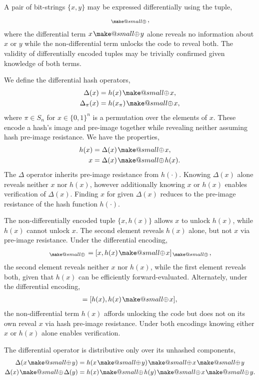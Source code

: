 \documentclass[twocolumn, aps, amsmath, amssymb, nofootinbib, superscriptaddress, longbibliography, doublefloatfix, table-of-contents, eqsecnum, rmp]{revtex4-2}
\makeatletter
\newcommand{\soplus}{{{\hspace{1pt}}{\mathbin{\mathpalette\make@small{\mathbin\oplus}}}}{\hspace{1pt}}}
\newcommand{\make@small}[2]{%
  \vcenter{\hbox{%
    \scalebox{0.6}{$\m@th#1#2$}%
  }}%
}
\makeatother
\begin{document}
A pair of bit-strings $\{x,y\}$ may be expressed differentially using the tuple,
\begin{align}
	[x,x\soplus y]_\soplus,
\end{align}
where the differential term $x\soplus y$ alone reveals no information about $x$ or $y$ while the non-differential term unlocks the code to reveal both. The validity of differentially encoded tuples may be trivially confirmed given knowledge of both terms.

We define the differential hash operators,
\begin{align}
	\Delta(x) &= h(x)\soplus x,\nonumber\\
	\Delta_\pi(x) &= h(x_\pi)\soplus x,
\end{align}
where $\pi\in S_n$ for $x\in\{0,1\}^n$ is a permutation over the elements of $x$. These encode a hash's image and pre-image together while revealing neither assuming hash pre-image resistance. We have the properties,
\begin{align}
	h(x) &= \Delta(x) \soplus x,\nonumber\\
	x &= \Delta(x) \soplus h(x).
\end{align}
The $\Delta$ operator inherits pre-image resistance from $h(\cdot)$. Knowing $\Delta(x)$ alone reveals neither $x$ nor $h(x)$, however additionally knowing $x$ or $h(x)$ enables verification of $\Delta(x)$. Finding $x$ for given $\Delta(x)$ reduces to the pre-image resistance of the hash function $h(\cdot)$.

The non-differentially encoded tuple $\{x,h(x)\}$ allows $x$ to unlock $h(x)$, while $h(x)$ cannot unlock $x$. The second element reveals $h(x)$ alone, but not $x$ via pre-image resistance. Under the differential encoding,
\begin{align}
	[x,\Delta(x)]_\soplus =[x,h(x)\soplus x]_\soplus,
\end{align}
the second element reveals neither $x$ nor $h(x)$, while the first element reveals both, given that $h(x)$ can be efficiently forward-evaluated. Alternately, under the differential encoding,
\begin{align}
	[h(x),\Delta(x)] = [h(x),h(x)\soplus x],
\end{align}
the non-differential term $h(x)$ affords unlocking the code but does not on its own reveal $x$ via hash pre-image resistance. Under both encodings knowing either $x$ or $h(x)$ alone enables verification.

The differential operator is distributive only over its unhashed components,
\begin{align}
	\Delta(x\soplus y) &= h(x\soplus y)\soplus x\soplus y \nonumber\\
	\Delta(x)\soplus\Delta(y) &= h(x)\soplus h(y)\soplus x\soplus y.
\end{align}
\end{document}
